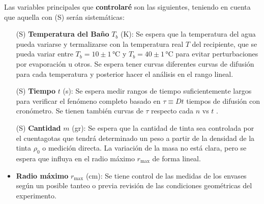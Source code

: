 \documentclass{article}[13pt]
\begin{document}
Las variables principales que \textbf{controlaré} son las siguientes, teniendo en cuenta que aquella con (S) serán sistemáticas:
\begin{itemize}
    \item[(S)] \textbf{Temperatura del Baño} $T_b$ (K): Se espera que la temperatura del agua pueda variarse y termalizarse con la temperatura real $T$ del recipiente, que se pueda variar entre $T_b = 10 \pm 1 \, \unit{\degreeCelsius}$ y $T_b = 40 \pm 1 \, \unit{\degreeCelsius}$ para evitar perturbaciones por evaporación u otros. Se espera tener curvas diferentes curvas de difusión para cada temperatura y posterior hacer el análisis en el rango lineal\cite{leeInkDifussionWater2004}.
    \item[(S)] \textbf{Tiempo} $t$ (s): Se espera medir rangos de tiempo suficientemente largos para verificar el fenómeno completo basado en $\tau\equiv Dt$ tiempos de difusión con cronómetro. Se tienen también curvas de $\tau$ respecto cada $n$ vs $t$ \cite{leeInkDifussionWater2004}.
    \item[(S)] \textbf{Cantidad} $m$ (gr): Se espera que la cantidad de tinta sea controlada por el cuentagotas que tendrá determinado un peso a partir de la densidad de la tinta $\rho_0$ o medición directa. La variación de la masa no está clara, pero se espera que influya en el radio máximo $r_{\text{max}}$ de forma lineal.
    \item \textbf{Radio máximo} $r_{\text{max}}$ (cm): Se tiene control de las medidas de los envases según un posible tanteo o previa revisión de las condiciones geométricas del experimento.
\end{itemize}
\end{document}
